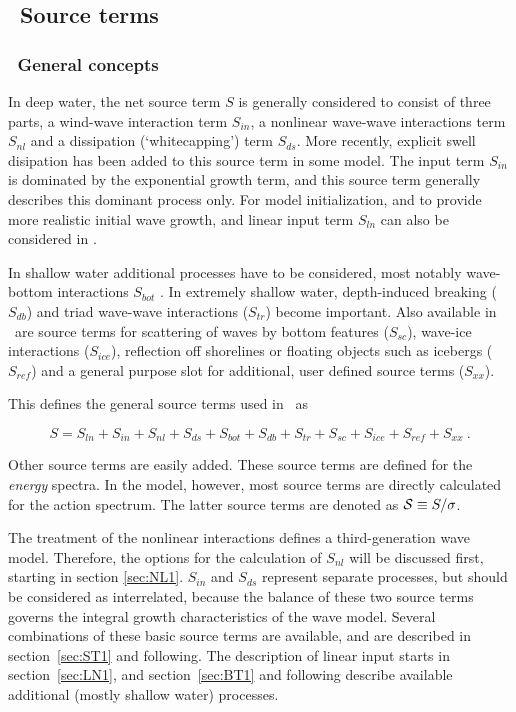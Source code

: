 \vssub
\subsection{~Source terms}
\vsssub
\subsubsection{~General concepts}
\vsssub

In deep water, the net source term $S$ is generally considered to consist of
three parts, a wind-wave interaction term $S_{in}$, a nonlinear wave-wave
interactions term $S_{nl}$ and a dissipation (`whitecapping') term
$S_{ds}$. More recently, explicit swell disipation has been added to this
source term in some model.  The input term $S_{in}$ is dominated by the
exponential growth term, and this source term generally describes this
dominant process only. For model initialization, and to provide more realistic
initial wave growth, and linear input term $S_{ln}$ can also be considered in
\ws.

In shallow water additional processes have to be considered, most notably
wave-bottom interactions $S_{bot}$ \cite[e.g.,][]{pro:Sea78}. In extremely
shallow water, depth-induced breaking ($S_{db}$) and triad wave-wave
interactions ($S_{tr}$) become important. Also available in \ws\ are source
terms for scattering of waves by bottom features ($S_{sc}$), wave-ice
interactions ($S_{ice}$), reflection off shorelines or floating objects such
as icebergs ($S_{ref}$) and a general purpose slot for additional, user
defined source terms ($S_{xx}$).

This defines the general source terms used in \ws\ as


\begin{equation}
S = S_{ln} + S_{in} + S_{nl} + S_{ds} + S_{bot} + S_{db} + S_{tr} +
    S_{sc} + S_{ice} + S_{ref} + S_{xx}\: .
\label{eq:general_st}
\end{equation}

\noindent
Other source terms are easily added. These source terms are defined for the
{\em energy} spectra. In the model, however, most source terms are directly
calculated for the action spectrum. The latter source terms are denoted as
${\cal S} \equiv S/\sigma$.

The treatment of the nonlinear interactions defines a third-generation wave
model. Therefore, the options for the calculation of $S_{nl}$ will be
discussed first, starting in section \ref{sec:NL1}. $S_{in}$ and $S_{ds}$
represent separate processes, but should be considered as interrelated,
because the balance of these two source terms governs the integral growth
characteristics of the wave model. Several combinations of these basic source
terms are available, and are described in section~\ref{sec:ST1} and following.
The description of linear input starts in section~\ref{sec:LN1}, and
section~\ref{sec:BT1} and following describe available additional (mostly
shallow water) processes.

